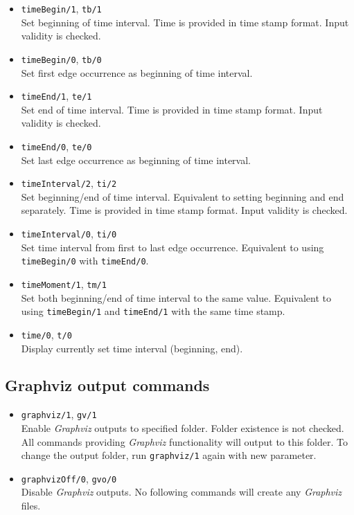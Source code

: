 \documentclass[11pt, a4paper]{article}
\newcommand{\pl}[1]{\texttt{#1}} %
\theoremstyle{plain}
\theoremstyle{definition}
\theoremstyle{remark}
\newcommand{\gv}{\textit{Graphviz}}
\begin{document}
\begin{itemize}
\item \pl{timeBegin/1}, \pl{tb/1} \\
Set beginning of time interval. 
Time is provided in time stamp format. 
Input validity is checked.

\item \pl{timeBegin/0}, \pl{tb/0} \\
Set first edge occurrence as beginning of time interval.

\item \pl{timeEnd/1}, \pl{te/1} \\
Set end of time interval. 
Time is provided in time stamp format. 
Input validity is checked.

\item \pl{timeEnd/0}, \pl{te/0} \\
Set last edge occurrence as beginning of time interval.

\item \pl{timeInterval/2}, \pl{ti/2} \\
Set beginning/end of time interval. 
Equivalent to setting beginning and end separately. 
Time is provided in time stamp format. 
Input validity is checked.

\item \pl{timeInterval/0}, \pl{ti/0} \\
Set time interval from first to last edge occurrence. 
Equivalent to using \pl{timeBegin/0} with \pl{timeEnd/0}.

\item \pl{timeMoment/1}, \pl{tm/1} \\
Set both beginning/end of time interval to the same value. 
Equivalent to using \pl{timeBegin/1} and \pl{timeEnd/1} with the same time stamp.

\item \pl{time/0}, \pl{t/0} \\
Display currently set time interval (beginning, end).
\end{itemize}

\subsection{Graphviz output commands}

\begin{itemize}
\item \pl{graphviz/1}, \pl{gv/1} \\
Enable \gv{} outputs to specified folder. 
Folder existence is not checked. 
All commands providing \gv{} functionality will output to this folder. 
To change the output folder, run \pl{graphviz/1} again with new parameter.

\item \pl{graphvizOff/0}, \pl{gvo/0} \\
Disable \gv{} outputs. No following commands will create any \gv{} files.
\end{itemize}
\end{document}
